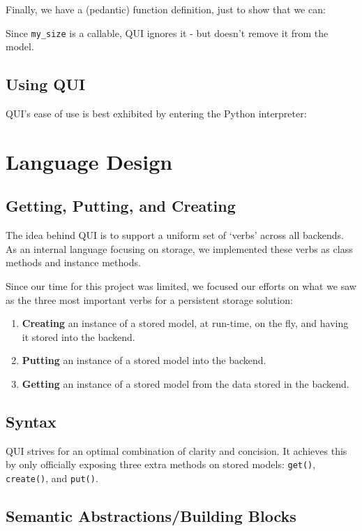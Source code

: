 \documentclass{article} %
\newcommand{\il}[1]{\lstinline{#1}}
\newcommand{\lstslice}[3]{
\begin{center}
\begin{minipage}{0.85\textwidth}

\end{minipage}
\end{center}
}
\begin{document}
Finally, we have a (pedantic) function definition, just to show that we can:
\lstslice{26}{28}{model_definitions.py}
Since \il{my_size} is a callable, QUI ignores it - but doesn't remove it from the model.

\subsection{Using QUI}
QUI's ease of use is best exhibited by entering the Python interpreter:

\section{Language Design}

\subsection{Getting, Putting, and Creating}
The idea behind QUI is to support a uniform set of `verbs' across all backends. As an internal language focusing on storage, we implemented
these verbs as class methods and instance methods.

Since our time for this project was limited, we focused our efforts on what we saw as the three most important verbs for a persistent storage solution:
\begin{enumerate}
\item \textbf{Creating} an instance of a stored model, at run-time, on the fly, and having it stored into the backend.
\item \textbf{Putting} an instance of a stored model into the backend.
\item \textbf{Getting} an instance of a stored model from the data stored in the backend.
\end{enumerate}


\subsection{Syntax}
QUI strives for an optimal combination of clarity and concision. It achieves this by only officially exposing three extra methods on stored models: \il{get()}, \il{create()}, and \il{put()}.
\subsection{Semantic Abstractions/Building Blocks}
\end{document}
